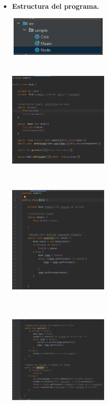 \documentclass[twoside,twocolumn]{article}
\begin{document}
	\begin{itemize}
		\item \textbf{Estructura del programa.}
		
		\begin{center}
			\includegraphics[width=5cm, height=2cm]{img1.png}
		\end{center}
		
		\begin{center}
			\includegraphics[width=5cm, height=6cm]{img2.png}
		\end{center}
		
		\begin{center}
			\includegraphics[width=5cm, height=6cm]{img3.png}
		\end{center}
		
		\begin{center}
			\includegraphics[width=5cm, height=6cm]{img4.png}
		\end{center}
		

\end{itemize}
\end{document}
